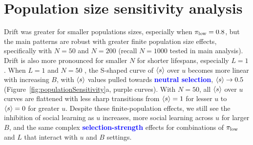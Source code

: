 \documentclass[letterpaper,11.5pt]{scrartcl}
\newcommand{\edit}[1]{{\bfseries \textcolor{blue} {#1}}}
\begin{document}

\clearpage



\newpage

\section{Population size sensitivity analysis}

Drift was greater for smaller populations sizes, especially when $\pi_{\mathrm{low}}=0.8$, but 
the main patterns are robust with greater finite population size effects, specifically
with $N=50$ and $N=200$ (recall $N=1000$ tested in main analysis). 
Drift is also more pronounced for smaller $N$
for shorter lifespans, especially $L=1$. When $L=1$ and $N=50$ , the S-shaped
curve of $\langle s \rangle$ over $u$ becomes more linear with increasing $B$, 
with $\langle s \rangle$ values pulled towards \edit{neutral selection}, $\langle s \rangle \to 0.5$ (Figure~\ref{fig:populationSensitivity}a,
purple curves). With
$N=50$, all $\langle s \rangle$ over $u$ curves are flattened with less sharp transitions
from $\langle s \rangle = 1$ for lesser $u$ to $\langle s \rangle = 0$ for greater $u$. Despite
these finite-population effects, we still see the inhibition of social learning
as $u$ increases, more social learning across $u$ for larger $B$, and the
same complex \edit{selection-strength} effects for combinations of $\pi_{\mathrm{low}}$ and $L$ that interact
with $u$ and $B$ settings.

\clearpage
\end{document}
